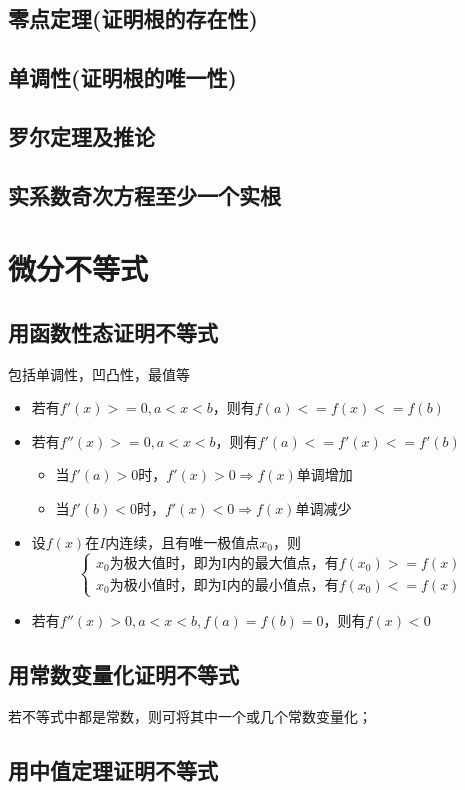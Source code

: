 \subsection{零点定理(证明根的存在性)}

\subsection{单调性(证明根的唯一性)}

\subsection{罗尔定理及推论}

\subsection{实系数奇次方程至少一个实根}


\section{微分不等式}

\subsection{用函数性态证明不等式}
包括单调性，凹凸性，最值等\begin{itemize}
    \item 若有\(f'(x) >= 0, a < x < b\)，则有\(f(a) <= f(x) <= f(b)\)
    \item 若有\(f''(x) >= 0, a < x < b\)，则有\(f'(a) <= f'(x) <= f'(b)\)\begin{itemize}
        \item 当\(f'(a) > 0\)时，\(f'(x) > 0 \Rightarrow f(x)\)单调增加
        \item 当\(f'(b) < 0\)时，\(f'(x) < 0 \Rightarrow f(x)\)单调减少
    \end{itemize}
    \item 设\(f(x)\)在\(I\)内连续，且有唯一极值点\(x_0\)，则\[\begin{cases}
        x_0\text{为极大值时，即为I内的最大值点，有}f(x_0) >= f(x) \\ 
        x_0\text{为极小值时，即为I内的最小值点，有}f(x_0) <= f(x)
    \end{cases}\]
    \item 若有\(f''(x) > 0, a < x < b, f(a) = f(b) = 0\)，则有\(f(x) < 0\)
\end{itemize}


\subsection{用常数变量化证明不等式}
若不等式中都是常数，则可将其中一个或几个常数变量化；


\subsection{用中值定理证明不等式}





